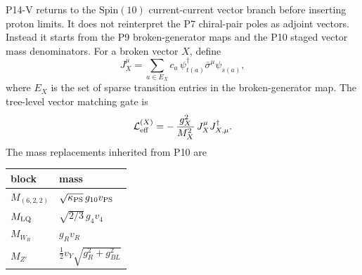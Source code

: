 \documentclass[11pt]{article}
\newcommand{\Spin}{\mathrm{Spin}}
\begin{document}
P14-V returns to the $\Spin(10)$ current-current vector branch before inserting
proton limits.  It does not reinterpret the P7 chiral-pair poles as adjoint
vectors.  Instead it starts from the P9 broken-generator maps and the P10
staged vector mass denominators.  For a broken vector $X$, define
\begin{equation}
  J_X^\mu
  =
  \sum_{a\in E_X}
  c_a\,\psi_{t(a)}^\dagger\bar\sigma^\mu\psi_{s(a)} ,
\end{equation}
where $E_X$ is the set of sparse transition entries in the broken-generator
map.  The tree-level vector matching gate is
\begin{equation}
  \mathcal L_{\rm eff}^{(X)}
  =
  -\,\frac{g_X^2}{M_X^2}\,
  J_X^\mu J_{X,\mu}^\dagger .
\end{equation}
The mass replacements inherited from P10 are
\begin{center}
\small
\begin{tabular}{ll}
\toprule
block & mass\\
\midrule
$M_{(6,2,2)}$ & $\sqrt{\kappa_{\rm PS}}\,g_{10}v_{\rm PS}$\\
$M_{\rm LQ}$ & $\sqrt{2/3}\,g_4v_4$\\
$M_{W_R}$ & $g_Rv_R$\\
$M_{Z'}$ & $\frac12 v_Y\sqrt{g_R^2+g_{BL}^2}$\\
\bottomrule
\end{tabular}
\end{center}
\end{document}
